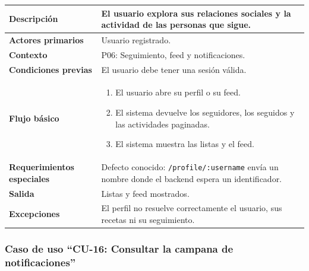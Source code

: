 \documentclass[doc,12pt,a4paper]{apa7}
\begin{document}
\begin{longtable}{|P{3.3cm}|L{11.2cm}|}
\hline
\textbf{Descripción} & El usuario explora sus relaciones sociales y la actividad de las personas que sigue. \\ \hline
\textbf{Actores primarios} & Usuario registrado. \\ \hline
\textbf{Contexto} & P06: Seguimiento, feed y notificaciones. \\ \hline
\textbf{Condiciones previas} & El usuario debe tener una sesión válida. \\ \hline
\textbf{Flujo básico} &
\begin{enumerate}
    \item El usuario abre su perfil o su feed.
    \item El sistema devuelve los seguidores, los seguidos y las actividades paginadas.
    \item El sistema muestra las listas y el feed.
\end{enumerate} \\ \hline
\textbf{Requerimientos especiales} & Defecto conocido: \texttt{/profile/:username} envía un nombre donde el backend espera un identificador. \\ \hline
\textbf{Salida} & Listas y feed mostrados. \\ \hline
\textbf{Excepciones} & El perfil no resuelve correctamente el usuario, sus recetas ni su seguimiento. \\ \hline
\end{longtable}

\subsubsection{Caso de uso ``CU-16: Consultar la campana de notificaciones''}
\end{document}

